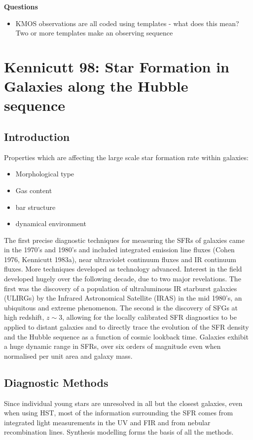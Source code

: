\documentclass{literature}
\begin{document}
\textbf{Questions}
\begin{itemize}
	\item KMOS observations are all coded using templates - what does this mean? Two or more templates make an observing sequence
\end{itemize}



\section{Kennicutt 98: Star Formation in Galaxies along the Hubble sequence}

\subsection{Introduction}
Properties which are affecting the large scale star formation rate within galaxies: 
\begin{itemize}
\item Morphological type 
\item Gas content 
\item bar structure 
\item dynamical environment
\end{itemize}

The first precise diagnostic techniques for measuring the SFRs of galaxies came in the 1970's and 1980's and included integrated emission line fluxes (Cohen 1976, Kennicutt 1983a), near ultraviolet continuum fluxes and IR continuum fluxes. More techniques developed as technology advanced. Interest in the field developed hugely over the following decade, due to two major revelations. The first was the discovery of a population of ultraluminous IR starburst galaxies (ULIRGs) by the Infrared Astronomical Satellite (IRAS) in the mid 1980's, an ubiquitous and extreme phenomenon. The second is the discovery of SFGs at high redshift, $z \sim 3$, allowing for the locally calibrated SFR diagnostics to be applied to distant galaxies and to directly trace the evolution of the SFR density and the Hubble sequence as a function of cosmic lookback time. Galaxies exhibit a huge dynamic range in SFRs, over six orders of magnitude even when normalised per unit area and galaxy mass.

\subsection{Diagnostic Methods}
Since individual young stars are unresolved in all but the closest galaxies, even when using HST, most of the information surrounding the SFR comes from integrated light measurements in the UV and FIR and from nebular recombination lines. Synthesis modelling forms the basis of all the methods. 
\end{document}
